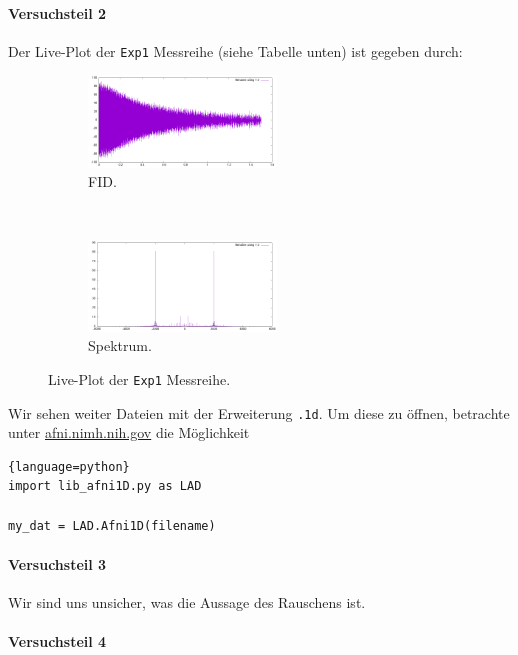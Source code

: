 \documentclass{subfiles}
\begin{document}
\paragraph*{Versuchsteil 2}
    Der Live-Plot der \texttt{Exp1} Messreihe (siehe Tabelle unten) ist gegeben durch:
    \begin{figure}[H]
        \centering
        \begin{subfigure}[b]{0.4\textwidth}
            \centering
            \includegraphics[width=5cm]{Live-Dokumente/Bilder/Exp1_FID.png}
            \caption{FID.}
        \end{subfigure}
        \
        \begin{subfigure}[b]{0.4\textwidth}
            \centering
            \includegraphics[width=5cm]{Live-Dokumente/Bilder/Exp1_Spectrum.png}
            \caption{Spektrum.}
        \end{subfigure}
        \caption{Live-Plot der \texttt{Exp1} Messreihe.}
        \label{fig:LivePlotExp1}
    \end{figure}
    Wir sehen weiter Dateien mit der Erweiterung \texttt{.1d}. Um diese zu öffnen, betrachte unter \href{https://afni.nimh.nih.gov/afni/community/board/read.php?1,160269,160270}{afni.nimh.nih.gov} die Möglichkeit 
\begin{lstlisting}{language=python}
import lib_afni1D.py as LAD

my_dat = LAD.Afni1D(filename)
\end{lstlisting}


\paragraph*{Versuchsteil 3}
    Wir sind uns unsicher, was die Aussage des Rauschens ist. 

\paragraph*{Versuchsteil 4}
\end{document}
